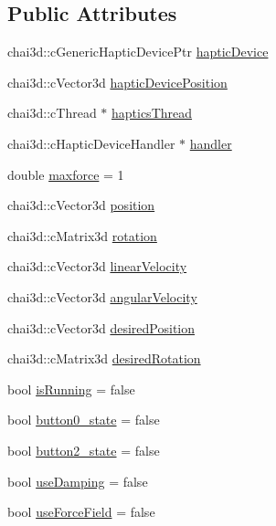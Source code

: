 \subsection*{Public Attributes}
\begin{DoxyCompactItemize}
\item 
chai3d\+::c\+Generic\+Haptic\+Device\+Ptr \hyperlink{classNovintFalconHapticsDevice_aa5184bbe68246d129003f66c3d5a9628}{haptic\+Device}
\item 
chai3d\+::c\+Vector3d \hyperlink{classNovintFalconHapticsDevice_a7815111e1968006b1a6848c040e0e310}{haptic\+Device\+Position}
\item 
chai3d\+::c\+Thread $\ast$ \hyperlink{classNovintFalconHapticsDevice_ab2de370251fd52cffabddb45b19c2a5b}{haptics\+Thread}
\item 
chai3d\+::c\+Haptic\+Device\+Handler $\ast$ \hyperlink{classNovintFalconHapticsDevice_a41bee64a24535ae175c1a5908ad5c63a}{handler}
\item 
double \hyperlink{classNovintFalconHapticsDevice_a8cdeb18d8b1e6468c6d4d2e3d2f3e55e}{maxforce} = 1
\item 
chai3d\+::c\+Vector3d \hyperlink{classNovintFalconHapticsDevice_a31027f37186c69612aaab345f6db4b2b}{position}
\item 
chai3d\+::c\+Matrix3d \hyperlink{classNovintFalconHapticsDevice_a28cf6108da9a0a2fd1830e517b4eb1f7}{rotation}
\item 
chai3d\+::c\+Vector3d \hyperlink{classNovintFalconHapticsDevice_a59f432627f7b981c9555216997110bcc}{linear\+Velocity}
\item 
chai3d\+::c\+Vector3d \hyperlink{classNovintFalconHapticsDevice_a8f71db7ac35c67569dac444e8ac91bb4}{angular\+Velocity}
\item 
chai3d\+::c\+Vector3d \hyperlink{classNovintFalconHapticsDevice_afcd63a3be7d519dd7f983414f9e0f24c}{desired\+Position}
\item 
chai3d\+::c\+Matrix3d \hyperlink{classNovintFalconHapticsDevice_acb82e8e4273b4979aae7cba6989058b6}{desired\+Rotation}
\item 
bool \hyperlink{classNovintFalconHapticsDevice_afa3018d647b1096332fc0076b9b70733}{is\+Running} = false
\item 
bool \hyperlink{classNovintFalconHapticsDevice_addebfcfc98d7e5593e369beea025e1bf}{button0\+\_\+state} = false
\item 
bool \hyperlink{classNovintFalconHapticsDevice_af016391ef02d82857ad1e65bf32faaa3}{button2\+\_\+state} = false
\item 
bool \hyperlink{classNovintFalconHapticsDevice_a8343a6b7e8c05449d1fd4daf39f346a9}{use\+Damping} = false
\item 
bool \hyperlink{classNovintFalconHapticsDevice_ab057b4217959d896c52fc5167be1314d}{use\+Force\+Field} = false
\end{DoxyCompactItemize}


